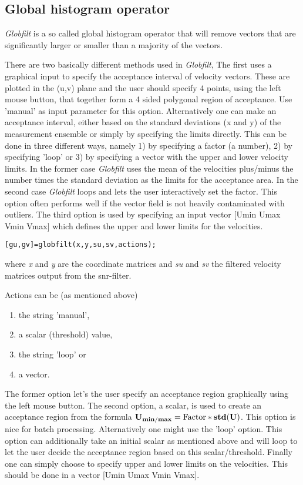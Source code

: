 \documentclass{book}
\begin{document}
\subsection{Global histogram operator}

{\em Globfilt} is a so called global histogram operator that will
remove vectors that are significantly larger or smaller than a
majority of the vectors.

There are two basically different methods used in {\em Globfilt}, The
first uses a graphical input to specify the acceptance interval of
velocity vectors. These are plotted in the (u,v) plane and the user
should specify 4 points, using the left mouse button, that together
form a 4 sided polygonal region of acceptance. Use 'manual' as input
parameter for this option.  Alternatively one can make an acceptance
interval, either based on the standard deviations (x and y) of the
measurement ensemble or simply by specifying the limits directly. This
can be done in three different ways, namely 1) by specifying a factor
(a number), 2) by specifying 'loop' or 3) by specifying a vector with
the upper and lower velocity limits. In the former case {\em Globfilt}
uses the mean of the velocities plus/minus the number times the
standard deviation as the limits for the acceptance area. In the
second case {\em Globfilt} loops and lets the user interactively set
the factor. This option often performs well if the vector field is not
heavily contaminated with outliers. The third option is used by
specifying an input vector [Umin Umax Vmin Vmax] which defines the
upper and lower limits for the velocities.

\begin{verbatim}
[gu,gv]=globfilt(x,y,su,sv,actions);
\end{verbatim}
where {\it x} and {\it y} are the coordinate matrices and {\it su} and
{\it sv} the filtered velocity matrices output from the snr-filter.
 
Actions can be (as mentioned above) 
\begin{enumerate}
\item the string 'manual', 
\item a scalar (threshold) value,
\item the string 'loop' or 
\item a vector. 
\end{enumerate}
The former option let's the user specify an acceptance region
graphically using the left mouse button. The second option, a scalar, is
used to create an acceptance region from the formula $\bf{U}_{min/max} =
\mbox{Factor}*std(\bf{U})$. This option is nice for batch processing.
Alternatively one might use the 'loop' option. This option can
additionally take an initial scalar as mentioned above and will loop to
let the user decide the acceptance region based on this
scalar/threshold. Finally one can simply choose to specify upper and
lower limits on the velocities. This should be done in a vector [Umin
Umax Vmin Vmax].
\end{document}
